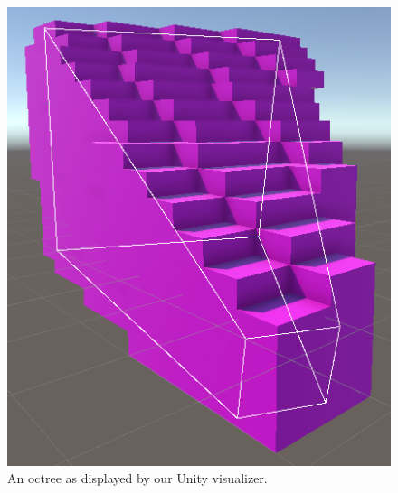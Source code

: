 \documentclass{PoliMi_MasterThesis}
\begin{document}
\begin{figure}[]
    \centering
    \includegraphics[width=\textwidth*\real{0.45}]{Images/octree_visualizer.png}
    \caption{An octree as displayed by our Unity visualizer.}
    \label{fig:octree_intro}
\end{figure}
\end{document}
